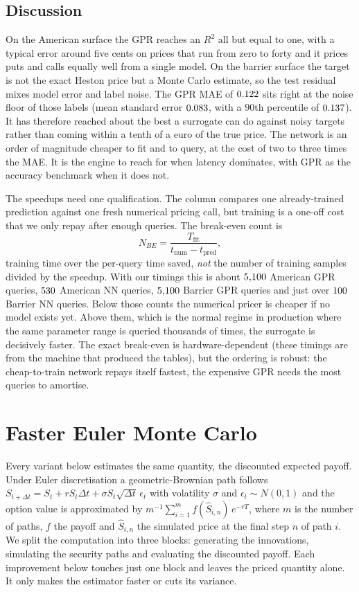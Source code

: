 \documentclass[12pt,a4paper]{article}
\begin{document}
\subsection{Discussion}
On the American surface the GPR reaches an $R^2$ all but equal to one, with a
typical error around five cents on prices that run from zero to forty and it
prices puts and calls equally well from a single model. On the barrier surface
the target is not the exact Heston price but a Monte Carlo estimate, so the test
residual mixes model error and label noise. The GPR MAE of $0.122$ sits right at
the noise floor of those labels (mean standard error $0.083$, with a $90$th
percentile of $0.137$). It has therefore reached about the best a surrogate can
do against noisy targets rather than coming within a tenth of a euro of the true price.
The network is an order of
magnitude cheaper to fit and to query, at the cost of two to three times the
MAE. It is the engine to reach for when latency dominates, with GPR as the
accuracy benchmark when it does not.

The speedups need one qualification. The column compares one already-trained
prediction against one fresh numerical pricing call, but training is a one-off
cost that we only repay after enough queries. The break-even count is
\[
N_{BE} = \frac{T_{\text{fit}}}{t_{\text{num}}-t_{\text{pred}}},
\]
training time over the per-query time saved, \emph{not} the number of training
samples divided by the speedup. With our timings this is about $5{,}100$
American GPR queries, $530$ American NN queries, $5{,}100$ Barrier GPR
queries and just over $100$ Barrier NN queries. Below those counts the numerical pricer is cheaper
if no model exists yet. Above them, which is the normal regime in production
where the same parameter range is queried thousands of times, the surrogate is
decisively faster. The exact break-even is hardware-dependent (these timings are
from the machine that produced the tables), but the ordering is robust: the
cheap-to-train network repays itself fastest, the expensive GPR needs the most
queries to amortise.

\clearpage
\section{Faster Euler Monte Carlo}

Every variant below estimates the same quantity, the discounted
expected payoff. Under Euler discretisation a geometric-Brownian path follows
$S_{t+\Delta t}=S_t+rS_t\Delta t+\sigma S_t\sqrt{\Delta t}\,\epsilon_t$ with
volatility $\sigma$ and $\epsilon_t\sim N(0,1)$ and the option value is
approximated by $m^{-1}\sum_{i=1}^{m} f(\widehat S_{i,n})\,e^{-rT}$, where $m$ is
the number of paths, $f$ the payoff and $\widehat S_{i,n}$ the simulated price at
the final step $n$ of path $i$. We split the
computation into three blocks: generating the innovations, simulating the
security paths and evaluating the discounted payoff. Each improvement below
touches just one block and leaves the priced quantity alone. It only makes the
estimator faster or cuts its variance.
\end{document}
